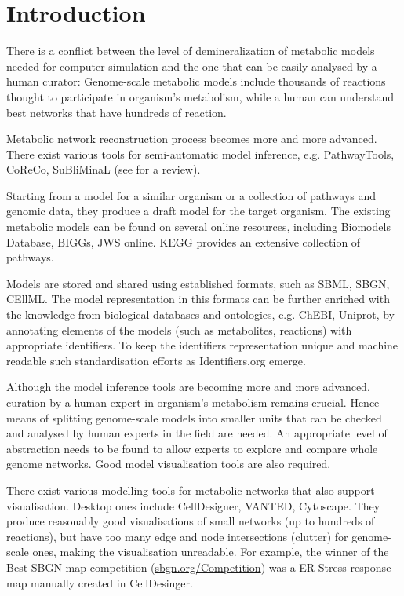 \documentclass{bioinfo}
\begin{document}
\section{Introduction}

There is a conflict between the level of demineralization of metabolic models needed for computer simulation and the one that can be easily analysed by a human curator: Genome-scale metabolic models include thousands of reactions thought to participate in organism's metabolism, while a human can understand best networks that have hundreds of reaction.

Metabolic network reconstruction process becomes more and more advanced. There exist various tools for semi-automatic model inference, e.g. PathwayTools\cite{Karp2002}, CoReCo\cite{Pitkanen2014}, SuBliMinaL\cite{Swainston2011} (see \cite{Hamilton2014} for a review).

Starting from a model for a similar organism or a collection of pathways and genomic data, they produce a draft model for the target organism. The existing metabolic models can be found on several online resources, including Biomodels Database\cite{Li10}, BIGGs\cite{Schellenberger2010}, JWS online\cite{Snoep2003}. KEGG\cite{Kanehisa12} provides an extensive collection of pathways. 

Models are stored and shared using established formats, such as SBML\cite{Hucka2003}, SBGN\cite{Moodie2011}, CEllML\cite{Lloyd2004}. The model representation in this formats can be further enriched with the knowledge from biological databases and ontologies, e.g. ChEBI\cite{deMatos10}, Uniprot\cite{TheUniProtConsortium2013}, by annotating elements of the models (such as metabolites, reactions) with appropriate identifiers. To keep the identifiers representation unique and machine readable such standardisation efforts as Identifiers.org\cite{Juty2012} emerge.


Although the model inference tools are becoming more and more advanced, curation by a human expert in organism's metabolism remains crucial. Hence means of splitting genome-scale models into smaller units that can be checked and analysed by human experts in the field are needed. An appropriate level of abstraction needs to be found to allow experts to explore and compare whole genome networks. Good model visualisation tools are also required.

There exist various modelling tools for metabolic networks that also support visualisation. Desktop ones include CellDesigner\cite{Funahashi2008}, VANTED\cite{Rohn2012}, Cytoscape\cite{Smoot2011}. They produce reasonably good visualisations of small networks (up to hundreds of reactions), but have too many edge and node intersections (clutter) for genome-scale ones, making the visualisation unreadable. For example,  the winner of the Best SBGN map competition (\href{http://www.sbgn.org/Competition/Competition_2011/}{sbgn.org/Competition}) was a ER Stress response\cite{Groenendyk2010} map manually created in CellDesinger.
\end{document}
